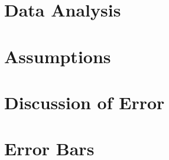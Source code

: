
\section{Data Analysis}


\section{Assumptions}


\section{Discussion of Error}


\section{Error Bars}

